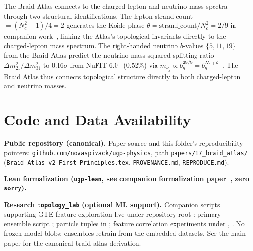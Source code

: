 \documentclass[11pt]{article}
\theoremstyle{remark}
\begin{document}
The Braid Atlas connects to the charged-lepton and neutrino mass spectra through two structural identifications.  The lepton strand count $= (N_c^2-1)/4 = 2$ generates the Koide phase $\theta = \text{strand\_count}/N_c^2 = 2/9$ in companion work~\cite{Spivack2026_Koide}, linking the Atlas's topological invariants directly to the charged-lepton mass spectrum.  The right-handed neutrino $b$-values $\{5,11,19\}$ from the Braid Atlas predict the neutrino mass-squared splitting ratio $\Delta m^2_{21}/\Delta m^2_{31}$ to $0.16\sigma$ from NuFIT 6.0~\cite{NuFIT60} ($0.52\%$) via $m_{\nu_g} \propto b_g^{29/9} = b_g^{N_c + \theta}$~\cite{Spivack2026_SM_UGP}.  The Braid Atlas thus connects topological structure directly to both charged-lepton and neutrino masses.

\section{Code and Data Availability}
\label{sec:availability}

\textbf{Public repository (canonical).} Paper source and this folder's reproducibility pointers: \newline\href{https://github.com/novaspivack/ugp-physics}{\texttt{github.com/novaspivack/ugp-physics}}, path \texttt{papers/17\_braid\_atlas/} (\texttt{Braid\_Atlas\_v2\_First\_Principles.tex}, \texttt{PROVENANCE.md}, \texttt{REPRODUCE.md}).

\textbf{Lean formalization (\texttt{ugp-lean}, see companion formalization paper~\cite{SpivackUGPFormalization}, zero \texttt{sorry}).}\newline
{} \quad{}\newline
{} \quad{}

\begin{sloppypar}
\textbf{Research \texttt{topology\_lab} (optional ML support).}\newline
Companion scripts supporting GTE feature exploration live under repository root : primary ensemble script ; particle tuples in ; feature correlation experiments under , . No frozen model blobs; ensembles retrain from the embedded datasets. See the main paper for the canonical braid atlas derivation.
\end{sloppypar}
\end{document}
